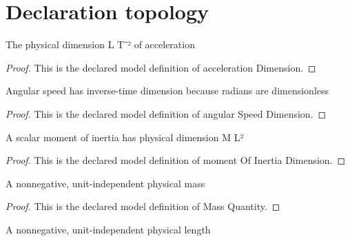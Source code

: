 \section{Declaration topology}
\begin{definition}
  \label{def:physics:phyx-mini-0789:phyxminiproblems-problemphyxmini0789-accelerationdimension}
  The physical dimension L T⁻² of acceleration
\end{definition}
\begin{proof}
  This is the declared model definition of acceleration Dimension.
\end{proof}
\begin{definition}
  \label{def:physics:phyx-mini-0789:phyxminiproblems-problemphyxmini0789-angularspeeddimension}
  Angular speed has inverse-time dimension because radians are dimensionless
\end{definition}
\begin{proof}
  This is the declared model definition of angular Speed Dimension.
\end{proof}
\begin{definition}
  \label{def:physics:phyx-mini-0789:phyxminiproblems-problemphyxmini0789-momentofinertiadimension}
  A scalar moment of inertia has physical dimension M L²
\end{definition}
\begin{proof}
  This is the declared model definition of moment Of Inertia Dimension.
\end{proof}
\begin{definition}
  \label{def:physics:phyx-mini-0789:phyxminiproblems-problemphyxmini0789-massquantity}
  A nonnegative, unit-independent physical mass
\end{definition}
\begin{proof}
  This is the declared model definition of Mass Quantity.
\end{proof}
\begin{definition}
  \label{def:physics:phyx-mini-0789:phyxminiproblems-problemphyxmini0789-lengthquantity}
  A nonnegative, unit-independent physical length
\end{definition}
